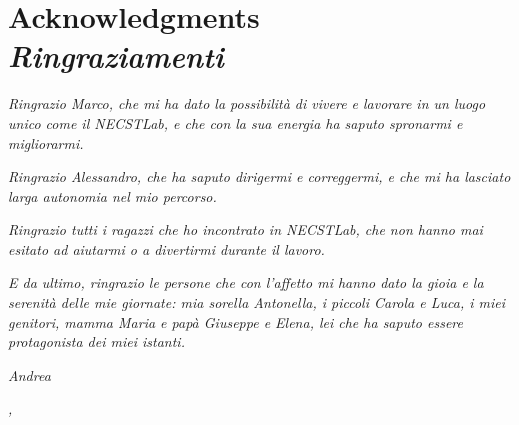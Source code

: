 %
%
\cleardoublepage
%
%
%
\chapter*{Acknowledgments\\\textit{Ringraziamenti}}
%

\textit{
Ringrazio Marco, che mi ha dato la possibilità di vivere e lavorare in un luogo unico come il NECSTLab, e che con la sua energia ha saputo spronarmi e migliorarmi.}

\medskip
\textit{
Ringrazio Alessandro, che ha saputo dirigermi e correggermi, e che mi ha lasciato larga autonomia nel mio percorso.
}

\medskip
\textit{
Ringrazio tutti i ragazzi che ho incontrato in NECSTLab, che non hanno mai esitato ad aiutarmi o a divertirmi durante il lavoro.
}

\medskip
\textit{
E da ultimo, ringrazio le persone che con l'affetto mi hanno dato la gioia e la serenità delle mie giornate: mia sorella Antonella, i piccoli Carola e Luca, i miei genitori, mamma Maria e papà Giuseppe e Elena, lei che ha saputo essere protagonista dei miei istanti.}
%

\bigskip

\hfill \textit{Andrea}


\hfill \textit{\myLocation, \myTime}

%

